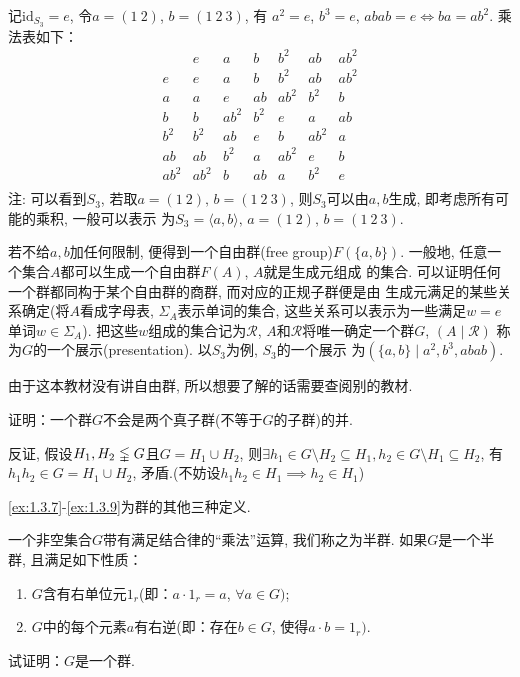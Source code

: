 \begin{solution}
    记$\mathrm{id}_{S_3} = e$, 令$a = (1\:2)$, $b = (1\:2\:3)$, 有
$a^2 = e$, $b^3 = e$, $abab = e \iff ba = ab^2$. 乘法表如下：
\[
\begin{array}{c|cccccc}
  & e   & a   & b   & b^2 & ab  & ab^2 \\
\hline
e  & e   & a   & b   & b^2 & ab  & ab^2 \\
a  & a   & e   & ab  & ab^2 & b^2 & b \\
b  & b   & ab^2 & b^2 & e   & a   & ab \\
b^2 & b^2 & ab  & e   & b   & ab^2 & a \\
ab & ab  & b^2 & a   & ab^2 & e   & b \\
ab^2 & ab^2 & b   & ab  & a   & b^2 & e \\
\end{array}
\]
注: 可以看到$S_3$, 若取$a = (1\:2),\, b = (1\:2\:3)$,
则$S_3$可以由$a, b$生成, 即考虑所有可能的乘积, 一般可以表示
为$S_3 = \langle a, b \rangle,\, a = (1\:2),\, b = (1\:2\:3)$.

若不给$a, b$加任何限制, 便得到一个自由群(free group)$F(\{a, b\})$.
一般地, 任意一个集合$A$都可以生成一个自由群$F(A)$, $A$就是生成元组成
的集合. 可以证明任何一个群都同构于某个自由群的商群, 而对应的正规子群便是由
生成元满足的某些关系确定(将$A$看成字母表, $\Sigma_A$表示单词的集合,
这些关系可以表示为一些满足$w = e$单词$w \in \Sigma_A$).
把这些$w$组成的集合记为$\mathscr{R}$,
$A$和$\mathscr{R}$将唯一确定一个群$G$, $(A \mid \mathscr{R})$
称为$G$的一个展示(presentation). 以$S_3$为例, $S_3$的一个展示
为$(\{a, b\} \mid a^2, b^3, abab)$.

由于这本教材没有讲自由群, 所以想要了解的话需要查阅别的教材.
\end{solution}

\begin{problem}
    证明：一个群$G$不会是两个真子群(不等于$G$的子群)的并.
\end{problem}

\begin{solution}
    反证, 假设$H_1, H_2 \lvertneqq G$且$G = H_1 \cup H_2$,
则$\exists h_1 \in G \setminus H_2 \subseteq H_1, h_2 \in G \setminus H_1 \subseteq H_2$,
有$h_1h_2 \in G = H_1 \cup H_2$, 矛盾.(不妨设$h_1h_2 \in H_1 \implies h_2 \in H_1$)
\end{solution}

\ref{ex:1.3.7}-\ref{ex:1.3.9}为群的其他三种定义.

\begin{problem}\label{ex:1.3.7}
    一个非空集合$G$带有满足结合律的“乘法”运算, 我们称之为半群.
如果$G$是一个半群, 且满足如下性质：
\begin{enumerate}[(1)]
    \item $G$含有右单位元$1_r$(即：$a \cdot 1_r = a$, $\forall a \in G)$;
    \item $G$中的每个元素$a$有右逆(即：存在$b \in G$, 使得$a \cdot b = 1_r)$.
\end{enumerate}
试证明：$G$是一个群.
\end{problem}

